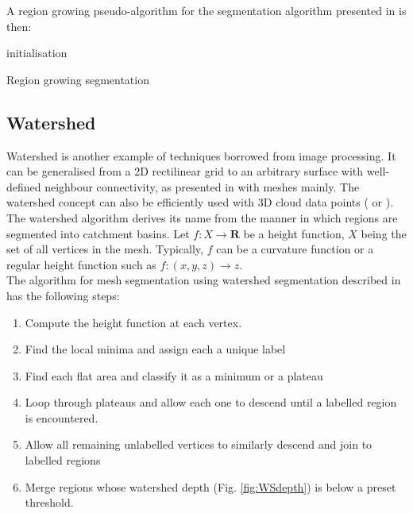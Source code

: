 \documentclass{kththesis}
\begin{document}
A region growing pseudo-algorithm for the segmentation algorithm presented in \parencite{PageRegionGrowing} is then:  \\
\begin{algorithm}[H]
 initialisation\;
 \caption{Region growing segmentation}
\end{algorithm}
\subsection{Watershed} 
Watershed is another example of techniques borrowed from image processing. It can be generalised from a 2D rectilinear grid to an arbitrary surface with well-defined neighbour connectivity, as presented in \textcite{ManganMeshWatershed} with meshes mainly. The watershed concept can also be efficiently used with 3D cloud data points (\textcite{det_seg_class} or \textcite{HernandezArtefacts}). \\
The watershed algorithm derives its name from the manner
in which regions are segmented into catchment basins. 
Let $f:X\rightarrow\mathbf{R}$ be a height function, $X$ being the set of all vertices in the mesh. Typically, $f$ can be a curvature function or a regular height function such as $f:(x,y,z)\rightarrow z$. \\

The algorithm for mesh segmentation using watershed segmentation described in \textcite{ManganMeshWatershed} has the following steps: 
\begin{enumerate}
    \item Compute the  height
function at each vertex.
    \item Find the local minima and assign each a unique
label
    \item Find each flat area and classify it as a minimum or a
plateau
    \item Loop through plateaus and allow each one to
descend until a labelled region is encountered.
    \item Allow all remaining unlabelled vertices to similarly
descend and join to labelled regions
    \item Merge regions whose watershed depth (Fig. \ref{fig:WSdepth}) is below a
preset threshold.
\end{enumerate}
\end{document}
